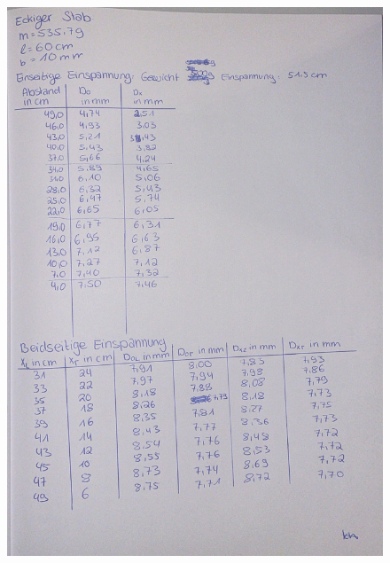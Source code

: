 \begin{figure}
    \centering
    \includegraphics[width=\textwidth]{messdaten/messdaten2.jpg}
\end{figure}